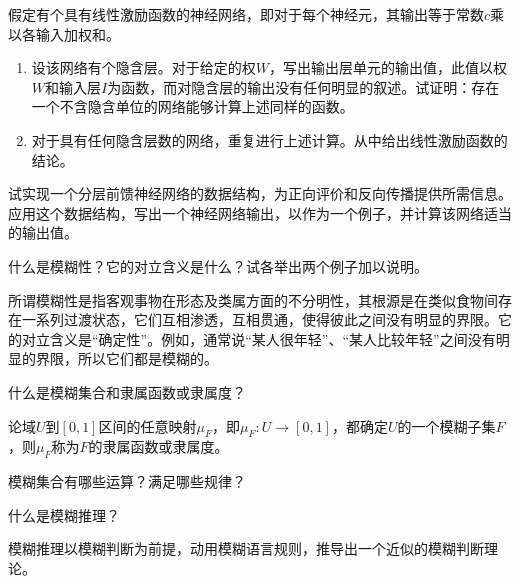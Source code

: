\begin{question}
假定有个具有线性激励函数的神经网络，即对于每个神经元，其输出等于常数$c$乘以各输入加权和。
	\begin{enumerate}
		\item 设该网络有个隐含层。对于给定的权$W$，写出输出层单元的输出值，此值以权$W$和输入层$I$为函数，而对隐含层的输出没有任何明显的叙述。试证明：存在一个不含隐含单位的网络能够计算上述同样的函数。
		\item 对于具有任何隐含层数的网络，重复进行上述计算。从中给出线性激励函数的结论。
	\end{enumerate}
\end{question}
\begin{solution}
\end{solution}

\begin{question}
试实现一个分层前馈神经网络的数据结构，为正向评价和反向传播提供所需信息。应用这个数据结构，写出一个神经网络输出，以作为一个例子，并计算该网络适当的输出值。
\end{question}
\begin{solution}
\end{solution}

\begin{question}
什么是模糊性？它的对立含义是什么？试各举出两个例子加以说明。
\end{question}
\begin{solution}
所谓模糊性是指客观事物在形态及类属方面的不分明性，其根源是在类似食物间存在一系列过渡状态，它们互相渗透，互相贯通，使得彼此之间没有明显的界限。它的对立含义是``确定性''。例如，通常说``某人很年轻''、``某人比较年轻''之间没有明显的界限，所以它们都是模糊的。
\end{solution}

\begin{question}
什么是模糊集合和隶属函数或隶属度？
\end{question}
\begin{solution}
论域$U$到$[0,1]$区间的任意映射$\mu_F$，即$\mu_F \colon U \to [0,1]$，都确定$U$的一个模糊子集$F$，则$\mu_F$称为$F$的隶属函数或隶属度。
\end{solution}

\begin{question}
模糊集合有哪些运算？满足哪些规律？
\end{question}
\begin{solution}
\end{solution}

\begin{question}
什么是模糊推理？
\end{question}
\begin{solution}
模糊推理以模糊判断为前提，动用模糊语言规则，推导出一个近似的模糊判断理论。
\end{solution}

